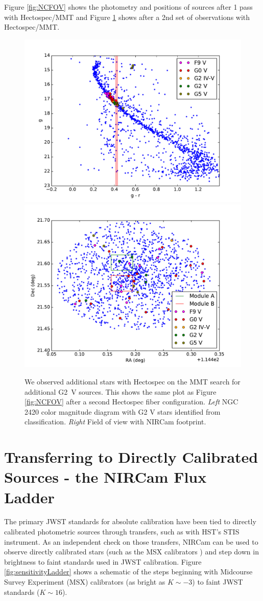 \documentclass{aastex6}
\begin{document}
Figure \ref{fig:NCFOV} shows the photometry and positions of sources after 1 pass with Hectospec/MMT and Figure \ref{fig:NCFOV2ndrun} shows after a 2nd set of observations with Hectospec/MMT.

\begin{figure}[!hbtp]
\centering
\includegraphics[width=.49\columnwidth]{colormag_two_runs.pdf}
\includegraphics[width=.49\columnwidth]{fov_ngc2420_two_runs.pdf}
\caption{We observed additional stars with Hectospec on the MMT search for additional G2~V sources. This shows the same plot as Figure \ref{fig:NCFOV} after a second Hectospec fiber configuration.
{\it Left} NGC 2420 color magnitude diagram with G2 V stars identified from classification. {\it Right} Field of view with NIRCam footprint.}\label{fig:NCFOV2ndrun}
\end{figure}

\clearpage

\section{Transferring to Directly Calibrated Sources - the NIRCam Flux Ladder}

The primary JWST standards for absolute calibration have been tied to directly calibrated photometric sources through transfers, such as with HST's STIS instrument.
As an independent check on those transfers, NIRCam can be used to observe directly calibrated stars (such as the MSX calibrators \citep{price2004msxCal}) and step down in brightness to faint standards used in JWST calibration.
Figure \ref{fig:sensitivityLadder} shows a schematic of the steps beginning with Midcourse Survey Experiment (MSX) calibrators (as bright as $K \sim -3$) to faint JWST standards ($K \sim 16$).
\end{document}
